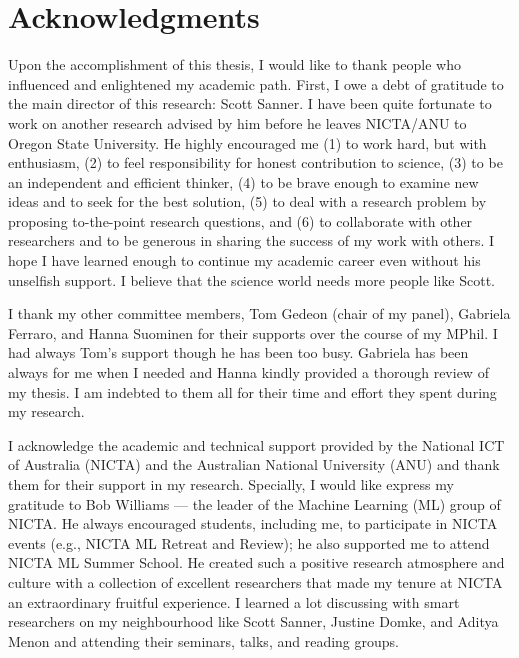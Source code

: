 \chapter*{Acknowledgments}

Upon the accomplishment of this thesis, I would like to thank people who influenced and enlightened my academic path. 
First, I owe a debt of gratitude to the main director of this research: Scott Sanner. I have been quite fortunate to work on another research advised by him before he leaves NICTA/ANU to Oregon State University. He highly encouraged me  (1) to work hard, but with enthusiasm, (2) to feel responsibility for honest contribution to science, (3) to be an independent and efficient thinker, (4) to be brave enough to examine new ideas and to seek for the best solution, (5) to deal with a research problem by proposing to-the-point research questions, and (6) to collaborate with other researchers and to be generous in sharing the success of my work with others. I hope I have learned enough to continue my academic career even without his unselfish support. I believe that the science world needs more people like Scott. 

I thank my other committee members, Tom Gedeon (chair of my panel), Gabriela Ferraro, and Hanna Suominen for their supports over the course of my MPhil. I had always Tom's support though he has been too busy. Gabriela has been always for me when I needed and Hanna kindly provided a thorough review of my thesis. 
I am indebted to them all for their time and effort they spent during my research. 

I acknowledge the academic and technical support provided by the
National ICT of Australia (NICTA) and the Australian National University (ANU)
and thank them for their support in my research. Specially, I would like express my gratitude to Bob Williams --- the leader of the Machine Learning (ML) group of NICTA. He always encouraged students, including me, to participate in NICTA events (e.g., NICTA ML Retreat and Review); he also supported me to attend NICTA ML Summer School. He created such a positive research atmosphere and culture with a collection of excellent researchers that made my tenure at NICTA an extraordinary fruitful experience. I learned a lot discussing with smart researchers on my neighbourhood like Scott Sanner, Justine Domke, and Aditya Menon and attending their seminars, talks, and reading groups. 

